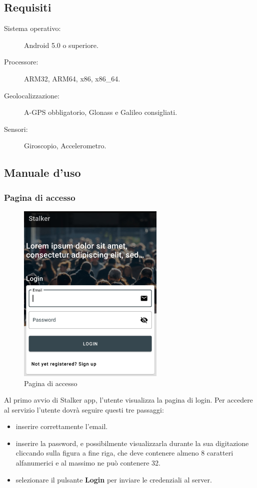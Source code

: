\documentclass[../manuale-utente.tex]{subfiles}
\begin{document}
\subsection{Requisiti}%
\label{sub:requisiti}

\begin{description}
    \item[Sistema operativo:] Android 5.0 o superiore.
    \item[Processore:] ARM32, ARM64, x86, x86\_64.
    \item[Geolocalizzazione:] A-GPS obbligatorio, Glonass e Galileo consigliati.
    \item[Sensori:] Giroscopio, Accelerometro.
\end{description}

\newpage
\subsection{Manuale d'uso}%
\label{sub:manuale-uso-mobile}

\subsubsection{Pagina di accesso}%
\label{sub:pagina-di-accesso}

\begin{figure}[H]
    \centering
    \includegraphics[width=70mm]{img/mobile-app/pagina-di-accesso.jpg}
    \caption{Pagina di accesso}%
    \label{fig:mobile-app-pagina-di-accesso}
\end{figure}

Al primo avvio di Stalker app, l'utente visualizza la pagina di login. 
Per accedere al servizio l'utente dovrà seguire questi tre passaggi:
\begin{itemize}
    \item inserire correttamente l'email.
    \item inserire la password, e possibilmente visualizzarla durante la sua digitazione cliccando sulla figura a fine riga, che deve contenere almeno 8 caratteri alfanumerici e al massimo ne può contenere 32.
    \item selezionare il pulsante \textbf{Login} per inviare le credenziali al server.
\end{itemize} 
\end{document}
